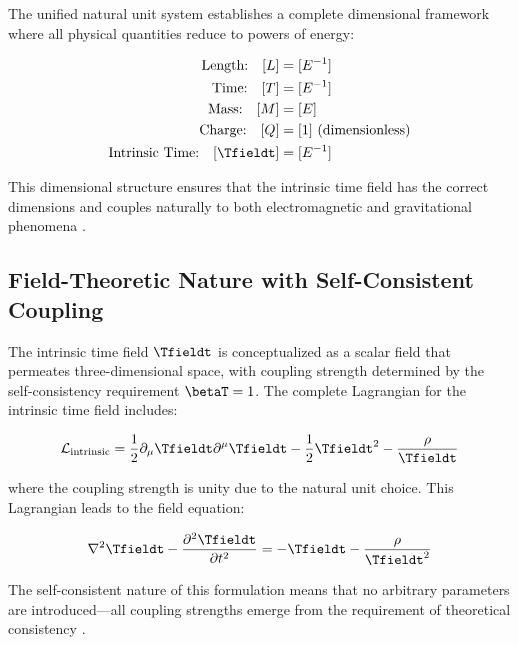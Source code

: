 	The unified natural unit system establishes a complete dimensional framework where all physical quantities reduce to powers of energy:
	
	\begin{tcolorbox}[colback=blue!5!white,colframe=blue!75!black,title=Unified Natural Units Dimensional Structure]
		\begin{align}
			\text{Length:} \quad [L] &= [E^{-1}] \nonumber\\
			\text{Time:} \quad [T] &= [E^{-1}] \nonumber\\
			\text{Mass:} \quad [M] &= [E] \nonumber\\
			\text{Charge:} \quad [Q] &= [1] \text{ (dimensionless)} \nonumber\\
			\text{Intrinsic Time:} \quad [\Tfieldt] &= [E^{-1}] \nonumber
		\end{align}
	\end{tcolorbox}
	
	This dimensional structure ensures that the intrinsic time field has the correct dimensions and couples naturally to both electromagnetic and gravitational phenomena \cite{pascher_lagrangian_2025}.
	
	\subsection{Field-Theoretic Nature with Self-Consistent Coupling}
	\label{subsec:field_theoretic_self_consistent}
	
	The intrinsic time field $\Tfieldt$ is conceptualized as a scalar field that permeates three-dimensional space, with coupling strength determined by the self-consistency requirement $\betaT = 1$. The complete Lagrangian for the intrinsic time field includes:
	
	\begin{equation}
		\mathcal{L}_{\text{intrinsic}} = \frac{1}{2} \partial_\mu \Tfieldt \partial^\mu \Tfieldt - \frac{1}{2}\Tfieldt^2 - \frac{\rho}{\Tfieldt}
	\end{equation}
	
	where the coupling strength is unity due to the natural unit choice. This Lagrangian leads to the field equation:
	
	\begin{equation}
		\nabla^2 \Tfieldt - \frac{\partial^2 \Tfieldt}{\partial t^2} = -\Tfieldt - \frac{\rho}{\Tfieldt^2}
	\end{equation}
	
	The self-consistent nature of this formulation means that no arbitrary parameters are introduced—all coupling strengths emerge from the requirement of theoretical consistency \cite{pascher_unified_2025}.
	
